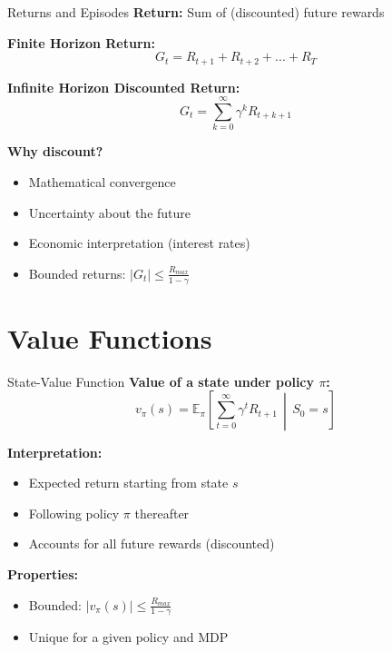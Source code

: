 \documentclass[aspectratio=169,10pt]{beamer}
\begin{document}
\begin{frame}{Returns and Episodes}
\textbf{Return:} Sum of (discounted) future rewards

\vspace{0.5cm}
\textbf{Finite Horizon Return:}
\begin{equation}
G_t = R_{t+1} + R_{t+2} + ... + R_T
\end{equation}

\textbf{Infinite Horizon Discounted Return:}
\begin{equation}
G_t = \sum_{k=0}^{\infty} \gamma^k R_{t+k+1}
\end{equation}

\textbf{Why discount?}
\begin{itemize}
    \item Mathematical convergence
    \item Uncertainty about the future
    \item Economic interpretation (interest rates)
    \item Bounded returns: $|G_t| \leq \frac{R_{max}}{1-\gamma}$
\end{itemize}
\end{frame}

\section{Value Functions}

\begin{frame}{State-Value Function}
\textbf{Value of a state under policy $\pi$:}
\begin{equation}
v_\pi(s) = \mathbb{E}_\pi\left[\sum_{t=0}^{\infty} \gamma^t R_{t+1} \,\middle|\, S_0 = s\right]
\end{equation}

\textbf{Interpretation:}
\begin{itemize}
    \item Expected return starting from state $s$
    \item Following policy $\pi$ thereafter
    \item Accounts for all future rewards (discounted)
\end{itemize}

\textbf{Properties:}
\begin{itemize}
    \item Bounded: $|v_\pi(s)| \leq \frac{R_{max}}{1-\gamma}$
    \item Unique for a given policy and MDP
\end{itemize}
\end{frame}
\end{document}
